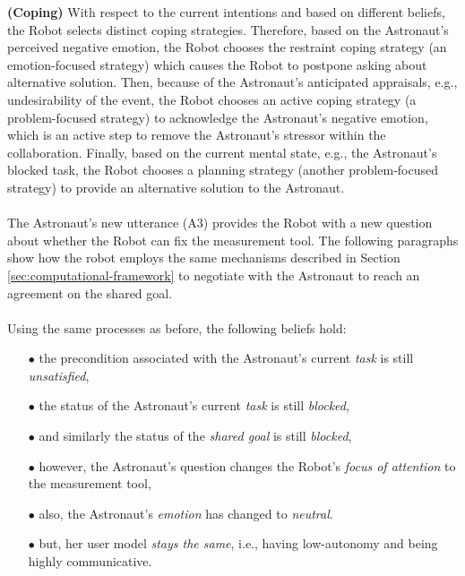 \noindent \textbf{(Coping)} With respect to the current intentions and based on
different beliefs, the Robot selects distinct coping strategies. Therefore,
based on the Astronaut's perceived negative emotion, the Robot chooses the
restraint coping strategy (an emotion-focused strategy) which causes the Robot
to postpone asking about alternative solution. Then, because of the Astronaut's
anticipated appraisals, e.g., undesirability of the event, the Robot chooses an
active coping strategy (a problem-focused strategy) to acknowledge the
Astronaut's negative emotion, which is an active step to remove the Astronaut's
stressor within the collaboration. Finally, based on the current mental state,
e.g., the Astronaut's blocked task, the Robot chooses a planning strategy
(another problem-focused strategy) to provide an alternative solution to the
Astronaut.\\

\noindent {}\\

The Astronaut's new utterance (A3) provides the Robot with a new question about
whether the Robot can fix the measurement tool. The following paragraphs show
how the robot employs the same mechanisms described in Section
\ref{sec:computational-framework} to negotiate with the Astronaut to reach an
agreement on the shared goal.\\

\noindent{}\\

\noindent Using the same processes as before, the following beliefs hold:

\begin{itemize}
  \item[$\bullet$] the precondition associated with the Astronaut's current
  \textit{task} is still \textit{unsatisfied},
  \item[$\bullet$] the status of the Astronaut's current \textit{task} is still
  \textit{blocked},
  \item[$\bullet$] and similarly the status of the \textit{shared goal} is
  still \textit{blocked},
  \item[$\bullet$] however, the Astronaut's question changes the Robot's
  \textit{focus of attention} to the measurement tool,
  \item[$\bullet$] also, the Astronaut's \textit{emotion} has changed to
  \textit{neutral}.
  \item[$\bullet$] but, her user model \textit{stays the same}, i.e.,
  having low-autonomy and being highly communicative.
\end{itemize}


